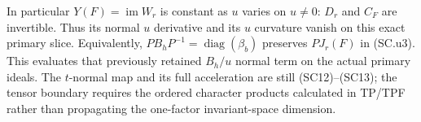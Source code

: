 In particular $Y(F)=\operatorname{im}W_r$ is constant as
$u$ varies on $u\ne0$: $D_r$ and $C_F$ are invertible.
Thus its normal $u$ derivative and its $u$ curvature vanish
on this exact primary slice.  Equivalently,
$PB_hP^{-1}=\operatorname{diag}(\beta_b)$ preserves
$PJ_r(F)$ in (SC.u3).  This evaluates that previously
retained $B_h/u$ normal term on the actual primary ideals.
The $t$-normal map and its full acceleration are still
(SC12)--(SC13); the tensor boundary requires the ordered
character products calculated in TP/TPF rather than
propagating the one-factor invariant-space dimension.

